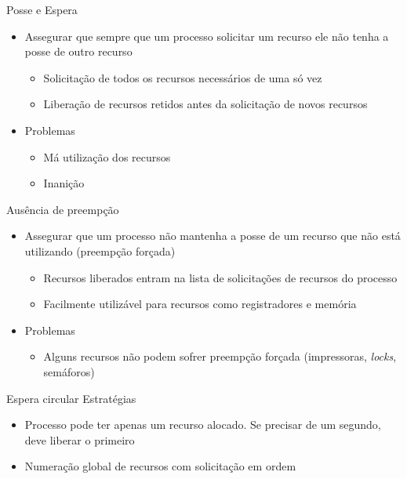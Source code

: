 \documentclass[aspectratio=169,
				xcolor=table]{beamer}
\begin{document}
	\begin{frame}{Posse e Espera}
		\begin{itemize}
			\item Assegurar que sempre que um processo solicitar um recurso ele não tenha a posse de outro recurso
			\begin{itemize}
				\item Solicitação de todos os recursos necessários de uma só vez
				\item Liberação de recursos retidos antes da solicitação de novos recursos
			\end{itemize}
			\vspace{1em}
			\pause
			\item Problemas
			\begin{itemize}
				\item Má utilização dos recursos
				\item Inanição
			\end{itemize}
		\end{itemize}
	\end{frame}
	
	\begin{frame}{Ausência de preempção}
		\begin{itemize}
			\item Assegurar que um processo não mantenha a posse de um recurso que não está utilizando (preempção forçada)
			\begin{itemize}
				\item Recursos liberados entram na lista de solicitações de recursos do processo			
				\item Facilmente utilizável para recursos como registradores e memória
			\end{itemize}
			\vspace{1em}
			\item Problemas
			\begin{itemize}
				\item Alguns recursos não podem sofrer preempção forçada (impressoras, \textit{locks}, semáforos)
			\end{itemize}			
		\end{itemize}
	\end{frame}
	
	\begin{frame}{Espera circular}
		Estratégias
		\begin{itemize}
			\item Processo pode ter apenas um recurso alocado. Se precisar de um segundo, deve liberar o primeiro
			\item Numeração global de recursos com solicitação em ordem	
		\end{itemize}	
	\end{frame}
	
\end{document}
